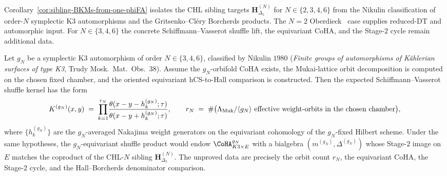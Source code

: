 Corollary~\ref{cor:sibling-BKMs-from-one-phiFA} isolates the CHL sibling
targets $\mathbf{H}_{\Delta_5}^{(N)}$ for $N \in \{2, 3, 4, 6\}$ from the
Nikulin classification of order-$N$ symplectic K3 automorphisms and the
Gritsenko--Cl\'ery Borcherds products. The $N = 2$
Oberdieck~\cite{Oberdieck2017} case supplies reduced-DT and automorphic
input. For $N \in \{3, 4, 6\}$ the concrete
Schiffmann--Vasserot shuffle lift, the equivariant CoHA, and the
Stage-$2$ cycle remain additional data.

\begin{conjecture}
\label{thm:gN-shuffle-refinement}
\ClaimStatusConjectured
Let $g_N$ be a symplectic K3 automorphism of order $N \in \{3, 4, 6\}$,
classified by Nikulin $1980$ (\emph{Finite groups of automorphisms of
K\"ahlerian surfaces of type K3}, Trudy Mosk.\ Mat.\ Obs.~$38$). Assume
the $g_N$-orbifold CoHA exists, the Mukai-lattice orbit decomposition is
computed on the chosen fixed chamber, and the oriented equivariant
hCS-to-Hall comparison is constructed. Then the expected
Schiffmann--Vasserot shuffle kernel has the form
\[
 K^{(g_N)}(x, y) \;=\; \prod_{k = 1}^{r_N}\!\frac{\theta(x - y - h_k^{(g_N)}; \tau)}{\theta(x - y + h_k^{(g_N)}; \tau)},
 \qquad
 r_N \;=\; \#\bigl(\Lambda_{\mathrm{Muk}}/\langle g_N\rangle
 \textup{ effective weight-orbits in the chosen chamber}\bigr),
\]
where $\{h_k^{(g_N)}\}$ are the $g_N$-averaged Nakajima weight generators
on the equivariant cohomology of the $g_N$-fixed Hilbert scheme. Under
the same hypotheses, the $g_N$-equivariant shuffle product would endow
$\CoHA^{g_N}_{K3 \times E}$ with a bialgebra
$(m^{(g_N)}, \Delta^{(g_N)})$ whose Stage-$2$ image on $E$ matches the
coproduct of the CHL-$N$ sibling $\mathbf{H}_{\Delta_5}^{(N)}$. The
unproved data are precisely the orbit count $r_N$, the equivariant CoHA,
the Stage-$2$ cycle, and the Hall--Borcherds denominator comparison.
\end{conjecture}

